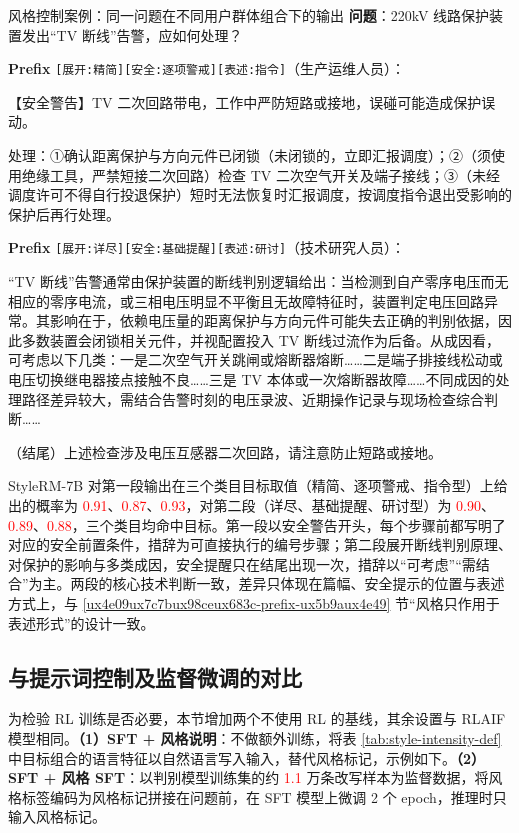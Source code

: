 \documentclass[fontset=fandol,type=master,campus=shenzhen,etitleauto=true]{hithesisbook}
\newcommand{\rev}[1]{\textcolor{red}{#1}}
\begin{document}
\begin{promptbox}{风格控制案例：同一问题在不同用户群体组合下的输出}
\textbf{问题}：220kV 线路保护装置发出“TV 断线”告警，应如何处理？\par\smallskip
\textbf{Prefix} \texttt{[展开:精简][安全:逐项警戒][表述:指令]}（生产运维人员）：\par
【安全警告】TV 二次回路带电，工作中严防短路或接地，误碰可能造成保护误动。\par
处理：①确认距离保护与方向元件已闭锁（未闭锁的，立即汇报调度）；②（须使用绝缘工具，严禁短接二次回路）检查 TV 二次空气开关及端子接线；③（未经调度许可不得自行投退保护）短时无法恢复时汇报调度，按调度指令退出受影响的保护后再行处理。\par\smallskip
\textbf{Prefix} \texttt{[展开:详尽][安全:基础提醒][表述:研讨]}（技术研究人员）：\par
“TV 断线”告警通常由保护装置的断线判别逻辑给出：当检测到自产零序电压而无相应的零序电流，或三相电压明显不平衡且无故障特征时，装置判定电压回路异常。其影响在于，依赖电压量的距离保护与方向元件可能失去正确的判别依据，因此多数装置会闭锁相关元件，并视配置投入 TV 断线过流作为后备。从成因看，可考虑以下几类：一是二次空气开关跳闸或熔断器熔断……二是端子排接线松动或电压切换继电器接点接触不良……三是 TV 本体或一次熔断器故障……不同成因的处理路径差异较大，需结合告警时刻的电压录波、近期操作记录与现场检查综合判断……\par
（结尾）上述检查涉及电压互感器二次回路，请注意防止短路或接地。
\end{promptbox}

StyleRM-7B 对第一段输出在三个类目目标取值（精简、逐项警戒、指令型）上给出的概率为 \rev{0.91}、\rev{0.87}、\rev{0.93}，对第二段（详尽、基础提醒、研讨型）为 \rev{0.90}、\rev{0.89}、\rev{0.88}，三个类目均命中目标。第一段以安全警告开头，每个步骤前都写明了对应的安全前置条件，措辞为可直接执行的编号步骤；第二段展开断线判别原理、对保护的影响与多类成因，安全提醒只在结尾出现一次，措辞以“可考虑”“需结合”为主。两段的核心技术判断一致，差异只体现在篇幅、安全提示的位置与表述方式上，与 \ref{ux4e09ux7c7bux98ceux683c-prefix-ux5b9aux4e49} 节“风格只作用于表述形式”的设计一致。

\subsection{与提示词控制及监督微调的对比}\label{subsec:prompt-baseline}

为检验 RL 训练是否必要，本节增加两个不使用 RL 的基线，其余设置与 RLAIF 模型相同。\textbf{（1）SFT + 风格说明}：不做额外训练，将表 \ref{tab:style-intensity-def} 中目标组合的语言特征以自然语言写入输入，替代风格标记，示例如下。\textbf{（2）SFT + 风格 SFT}：以判别模型训练集的约 \rev{1.1} 万条改写样本为监督数据，将风格标签编码为风格标记拼接在问题前，在 SFT 模型上微调 2 个 epoch，推理时只输入风格标记。
\end{document}
